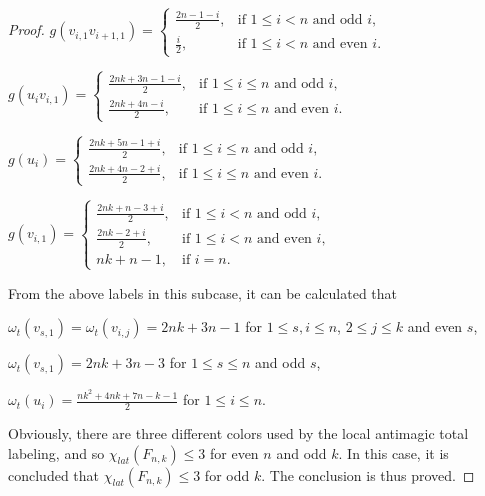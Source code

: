 \documentclass[10pt,a4paper]{amsart}
\begin{document}
\begin{proof}
$g(v_{i,1}v_{i+1,1})=\begin{cases}
                       \frac{2n-1-i}{2}, & \text{if $1\leq i<n$ and odd $i$},\\[4pt]
                       \frac{i}{2}, & \text{if $1\leq i<n$ and even $i$}.\end{cases}$\vspace{0.4em}

$ g(u_{i}v_{i,1})=\begin{cases}
           \frac{2nk+3n-1-i}{2}, & \text{if $1\leq i\leq n$ and odd $i$},\\[4pt]
           \frac{2nk+4n-i}{2}, & \text{if $1\leq i\leq n$ and even $i$}.\end{cases}$\vspace{0.4em}

$g(u_{i})=\begin{cases}
    \frac{2nk+5n-1+i}{2}, & \text{if $1\leq i\leq n$ and odd $i$},\\[4pt]
    \frac{2nk+4n-2+i}{2}, & \text{if $1\leq i\leq n$ and even $i$}.\end{cases}$\vspace{0.4em}

$g(v_{i,1})=\begin{cases}
           \frac{2nk+n-3+i}{2}, & \text{if $1\leq i<n$ and odd $i$},\\[4pt]
            \frac{2nk-2+i}{2},    & \text{if $1\leq i<n$ and even $i$},\\[4pt]
                       nk+n-1, &\text{if } i=n.\end{cases}$\vspace{0.4em}

\noindent From the above labels in this subcase, it can be calculated that

$\omega_{t}(v_{s,1})=\omega_{t}(v_{i,j})=2nk+3n-1$ for $1\leq s,i\leq n$, $2\leq j\leq k$ and even $s$,

$\omega_{t}(v_{s,1})=2nk+3n-3$ for $1\leq s\leq n$ and odd $s$,

$\omega_{t}(u_{i})=\frac{nk^{2}+4nk+7n-k-1}{2}$ for $1\leq i\leq n$.

\noindent Obviously, there are three different colors used by the local antimagic total labeling, and so $\chi_{lat}(F_{n,k})\leq 3$ for even $n$ and odd $k$. In this case, it is concluded that $\chi_{lat}(F_{n,k})\leq 3$ for odd $k$. The conclusion is thus proved.\end{proof}
\end{document}
